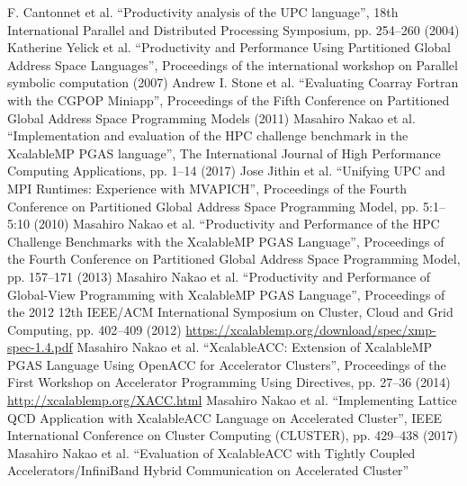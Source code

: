 \begin{thebibliography}{99.}%
%
%
 F. Cantonnet et al.
  ``Productivity analysis of the UPC language'', 18th International Parallel and Distributed Processing Symposium, pp. 254--260 (2004)
%
 Katherine Yelick et al.
  ``Productivity and Performance Using Partitioned Global Address Space Languages'', Proceedings of the international workshop on Parallel symbolic computation (2007)
%
 Andrew I. Stone et al.
``Evaluating Coarray Fortran with the CGPOP Miniapp'', Proceedings of the Fifth Conference on Partitioned Global Address Space Programming Models (2011)
%
 Masahiro Nakao et al.
``Implementation and evaluation of the HPC challenge benchmark in the XcalableMP PGAS language'',
The International Journal of High Performance Computing Applications, pp. 1--14 (2017)
%
 Jose Jithin et al.
``Unifying UPC and MPI Runtimes: Experience with MVAPICH'',
Proceedings of the Fourth Conference on Partitioned Global Address Space Programming Model, pp. 5:1--5:10 (2010)
%
 Masahiro Nakao et al.
``Productivity and Performance of the HPC Challenge Benchmarks with the XcalableMP PGAS Language'',
Proceedings of the Fourth Conference on Partitioned Global Address Space Programming Model, pp. 157--171 (2013)
%
 Masahiro Nakao et al.
``Productivity and Performance of Global-View Programming with XcalableMP PGAS Language'',
Proceedings of the 2012 12th IEEE/ACM International Symposium on Cluster, Cloud and Grid Computing,
pp. 402--409 (2012)
%
 \url{https://xcalablemp.org/download/spec/xmp-spec-1.4.pdf}
%
 Masahiro Nakao et al.
``XcalableACC: Extension of XcalableMP PGAS Language Using OpenACC for Accelerator Clusters'',
Proceedings of the First Workshop on Accelerator Programming Using Directives, pp. 27--36 (2014)
%
 \url{http://xcalablemp.org/XACC.html}
%
 Masahiro Nakao et al.
``Implementing Lattice QCD Application with XcalableACC Language on Accelerated Cluster'',
IEEE International Conference on Cluster Computing (CLUSTER), pp. 429--438 (2017)
%
 Masahiro Nakao et al.
  ``Evaluation of XcalableACC with Tightly Coupled Accelerators/InfiniBand Hybrid Communication on Accelerated Cluster''

\end{thebibliography}
